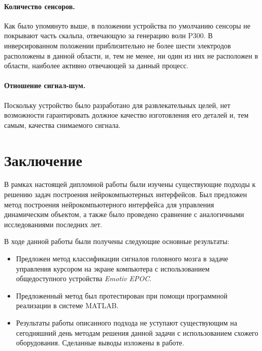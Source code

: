 \documentclass[12pt,a4paper,oneside,fleqn,leqno]{article}
\begin{document}
	\paragraph{Количество сенсоров.}
	\par Как было упомянуто выше, в положении устройства по умолчанию сенсоры не покрывают часть скальпа, отвечающую за генерацию волн P300. В инверсированном положении приблизительно не более шести электродов расположены в данной области, и, тем не менее, ни один из них не расположен в области, наиболее активно отвечающей за данный процесс.
	\paragraph{Отношение сигнал-шум.}
	\par Поскольку устройство было разработано для развлекательных целей, нет возможности гарантировать должное качество изготовления его деталей и, тем самым, качества снимаемого сигнала.

\newpage
\section{Заключение}
	\par В рамках настоящей дипломной работы были изучены существующие подходы к решению задач построения нейрокомпьютерных интерфейсов. Был предложен метод построения нейрокомпьютерного интерфейса для управления динамическим объектом, а также было проведено сравнение с аналогичными исследованиями последних лет.
	\par В ходе данной работы были получены следующие основные результаты:
	\begin{itemize}\itemsep0pt
		\item
		Предложен метод классификации сигналов головного мозга в задаче управления курсором на экране компьютера с использованием общедоступного устройства {\it Emotiv EPOC}.
		\item
		Предложенный метод был протестирован при помощи программной реализации в системе MATLAB.
		\item
		Результаты работы описанного подхода не уступают существующим на сегодняшний день методам решения данной задачи с использованием схожего оборудования. Сделанные выводы изложены в работе.
	\end{itemize}\par


\newpage

\renewcommand{\bibname}{Список литературы}
\addcontentsline{toc}{section}{\bibname}
\end{document}
